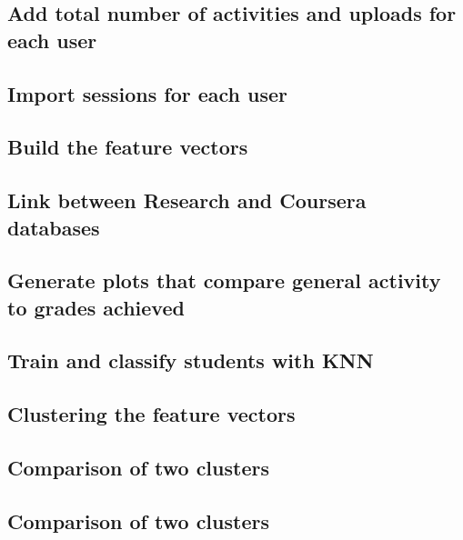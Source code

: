 \documentclass[11pt, oneside]{article}   	%
\begin{document}
\subsection{Add total number of activities and uploads for each user}
	
	\label{countActivitiesAndUploads}
\subsection{Import sessions for each user}
	
	\label{makeSessions}
\subsection{Build the feature vectors}
	
	\label{featureVectorsToJson}
\subsection{Link between Research and Coursera databases}
	
	\label{dbLink}
\subsection{Generate plots that compare general activity to grades achieved}
	
	\label{groundTruth}
\subsection{Train and classify students with KNN}
	
	\label{knn}
\subsection{Clustering the feature vectors}
	
	\label{clustering}
\subsection{Comparison of two clusters}
	
	\label{clusteringComparison}
\subsection{Comparison of two clusters}
	
	\label{script:pcaScript}
\end{document}
